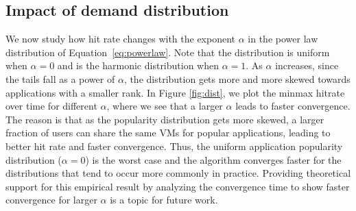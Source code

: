 \documentclass[conference]{IEEEtran}
\newcommand{\comment}[1]{}
\begin{document}
\comment{
\subsection{Impact of load}
\begin{figure}[t]
\centering
\texttt{[image: zipf\_heatmap\_spread4.pdf]}
\caption{Heatmap shows that convergence is faster if the cache size ($\kappa$) and/or number of servers ($n_s$) is larger for same number of users ($n_u$). ($\alpha=0.65, \tau=10,\sigma=4.$)}
\label{fig:heat}
\end{figure}
Now we look at the performance of our algorithm under varying load conditions. Recall load $l  = n_u/ (\kappa \cdot n_s)$.
Figure \ref{fig:heat} shows convergence time as a heatmap with different
values of cache size $\kappa$ and number of servers $n_s$. The convergence time varies from lower (blue) to higher (red) values. The figure also shows contours where the load is fixed. The white block in the bottom left corner represents 
high load closer to $1$ where our algorithm did not converge within a reasonable amount of time. It is easy to see that convergence time is faster when either the number of servers or the cache size increases. Figure~\ref{fig:load} shows this trend more explicitly as the convergence timße increases with increasing load.
The reason for this behavior is that as load increases there is more contention for the cache resources requiring more time for the algorithm to find a suitable server for each user.
}

\subsection{Impact of demand distribution}



We now study  how hit rate changes with the exponent $\alpha$ in the power law distribution of Equation~\ref{eq:powerlaw}.  Note that the distribution is uniform when $\alpha = 0$ and is the harmonic distribution when $\alpha = 1$.  As $\alpha$ increases, since the tails fall as a power of $\alpha$,  the distribution gets more and more skewed towards applications with a smaller rank. In  Figure \ref{fig:dist}, we plot the minmax hitrate over  time for different $\alpha$, where we see that a larger $\alpha$ leads to faster convergence. The reason is that as the popularity distribution gets more skewed, a larger fraction of users can share the same VMs for popular applications, leading to better hit rate and faster convergence. 
Thus, the uniform application popularity distribution ($\alpha=0$)  is the worst case and the algorithm converges faster for the distributions that tend to occur more commonly in practice. Providing theoretical support for this empirical result by analyzing the convergence time to show faster convergence for larger $\alpha$ is a topic for future work.
\end{document}
